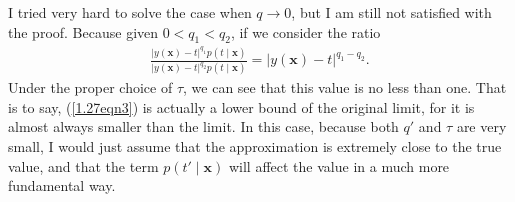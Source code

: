 \begin{afternote}
	I tried very hard to solve the case when $q \rightarrow 0$, but I am still not satisfied with the proof. Because given $0 < q_1 < q_2$, if we consider the ratio
	\begin{align}
		\frac{\lvert y(\bm{x}) - t \rvert^{q_1} p(t \mid \bm{x})}{\lvert y(\bm{x}) - t \rvert^{q_2} p(t \mid \bm{x})} = \lvert y(\bm{x}) - t \rvert^{q_1 - q_2}.
	\end{align}
	Under the proper choice of $\tau$, we can see that this value is no less than one. That is to say, (\ref{1.27eqn3}) is actually a lower bound of the original limit, for it is almost always smaller than the limit. In this case, because both $q'$ and $\tau$ are very small, I would just assume that the approximation is extremely close to the true value, and that the term $p(t' \mid \bm{x})$ will affect the value in a much more fundamental way.
\end{afternote}